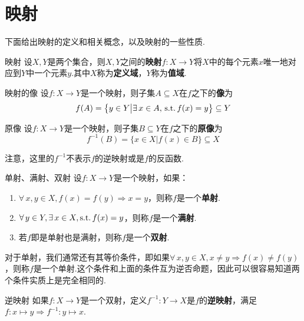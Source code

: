 \section{映射}

下面给出映射的定义和相关概念，以及映射的一些性质.

\begin{definition}{映射}
    设$X,Y$是两个集合，则$X,Y$之间的\textbf{映射}$f:X\to Y$将$X$中的每个元素$x$唯一地对应到$Y$中一个元素$y$.其中$X$称为\textbf{定义域}，$Y$称为\textbf{值域}.
\end{definition}

\begin{definition}{映射的像}
    设$f:X\to Y$是一个映射，则子集$A\subseteq X$在$f$之下的\textbf{像}为
    \[f(A)=\big\{y\in Y\big|\exists\, x\in A,\,\operatorname{\text{s.t.}} f(x)=y \big\}\subseteq Y\]
\end{definition}

\begin{definition}{原像}
    设$f:X\to Y$是一个映射，则子集$B\subseteq Y$在$f$之下的\textbf{原像}为
    \[f^{-1}(B)=\big\{x\in X\big|f(x)\in B \big\}\subseteq X\]
\end{definition}

\begin{notice}
    注意，这里的$f^{-1}$不表示$f$的逆映射或是$f$的反函数.
\end{notice}

\begin{definition}{单射、满射、双射}
    设$f:X\to Y$是一个映射，如果：
    \begin{enumerate}
        \item $\forall\, x,y\in X,f(x)=f(y)\Rightarrow x=y$，则称$f$是一个\textbf{单射}.
        \item $\forall\,y\in Y,\exists\, x\in X,\operatorname{\text{s.t.}} f(x)=y$，则称$f$是一个\textbf{满射}.
        \item 若$f$即是单射也是满射，则称$f$是一个\textbf{双射}.
    \end{enumerate}
\end{definition}
对于单射，我们通常还有其等价条件，即如果$\forall\, x,y\in X,x\neq y\Rightarrow f(x)\neq f(y)$，则称$f$是一个单射.这个条件和上面的条件互为逆否命题，因此可以很容易知道两个条件实质上是完全相同的.





\begin{definition}{逆映射}
    如果$f:X\to Y$是一个双射，定义$f^{-1}:Y\to X$是$f$的\textbf{逆映射}，满足$f:x\mapsto y \Rightarrow f^{-1}:y\mapsto x$.
\end{definition}

